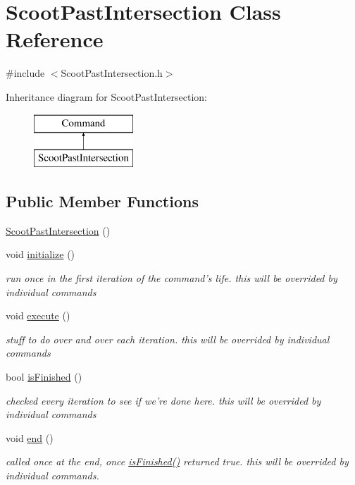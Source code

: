 \hypertarget{classScootPastIntersection}{\section{Scoot\-Past\-Intersection Class Reference}
\label{classScootPastIntersection}
}


{\ttfamily \#include $<$Scoot\-Past\-Intersection.\-h$>$}

Inheritance diagram for Scoot\-Past\-Intersection\-:\begin{figure}[H]
\begin{center}
\leavevmode
\includegraphics[height=2.000000cm]{classScootPastIntersection}
\end{center}
\end{figure}
\subsection*{Public Member Functions}
\begin{DoxyCompactItemize}
\item 
\hyperlink{classScootPastIntersection_ac496bf3a58f4754025b32757c3fb1094}{Scoot\-Past\-Intersection} ()
\item 
void \hyperlink{classScootPastIntersection_a8f741b21641a42bb5bcf4e0b67c6f0b5}{initialize} ()
\begin{DoxyCompactList}\small\item\em run once in the first iteration of the command's life. this will be overrided by individual commands \end{DoxyCompactList}\item 
void \hyperlink{classScootPastIntersection_adce5027b638c8d23dbcff7cbb837885f}{execute} ()
\begin{DoxyCompactList}\small\item\em stuff to do over and over each iteration. this will be overrided by individual commands \end{DoxyCompactList}\item 
bool \hyperlink{classScootPastIntersection_a190d072051601ebc40b193d91bc323df}{is\-Finished} ()
\begin{DoxyCompactList}\small\item\em checked every iteration to see if we're done here. this will be overrided by individual commands \end{DoxyCompactList}\item 
void \hyperlink{classScootPastIntersection_a7696d93dc3789a4f3923aba22028b093}{end} ()
\begin{DoxyCompactList}\small\item\em called once at the end, once \hyperlink{classScootPastIntersection_a190d072051601ebc40b193d91bc323df}{is\-Finished()} returned true. this will be overrided by individual commands. \end{DoxyCompactList}\end{DoxyCompactItemize}
